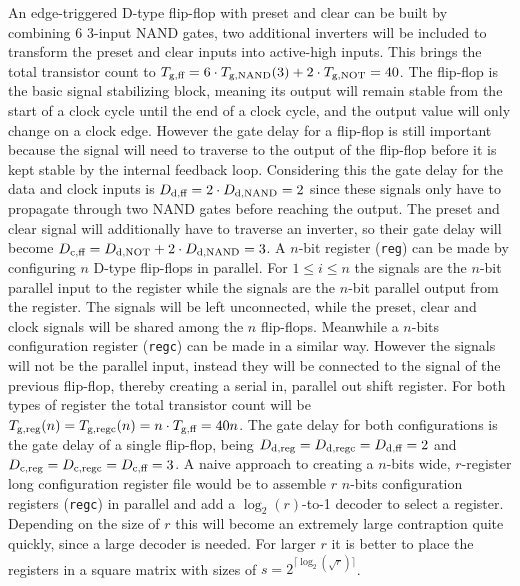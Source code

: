 \begin{itemize}
    An edge-triggered D-type flip-flop with preset and clear can be built by combining $6$ $3$-input NAND gates\cite{74x74}, two additional inverters will be included to transform the preset and clear inputs into active-high inputs. This brings the total transistor count to $\f{T}{g}{ff} = 6 \cdot \f{T}{g}{NAND}(3) + 2 \cdot \f{T}{g}{NOT} = 40$. The flip-flop is the basic signal stabilizing block, meaning its output will remain stable from the start of a clock cycle until the end of a clock cycle, and the output value will only change on a clock edge. However the gate delay for a flip-flop is still important because the signal will need to traverse to the output of the flip-flop before it is kept stable by the internal feedback loop. Considering this the gate delay for the data and clock inputs is $\f{D}{d}{ff} = 2 \cdot \f{D}{d}{NAND} = 2$ since these signals only have to propagate through two NAND gates before reaching the output. The preset and clear signal will additionally have to traverse an inverter, so their gate delay will become $\f{D}{c}{ff} = \f{D}{d}{NOT} + 2 \cdot \f{D}{d}{NAND} = 3$.
    A $n$-bit register (\texttt{reg}) can be made by configuring $n$ D-type flip-flops in parallel. For $1 \leq i \leq n$ the  signals are the $n$-bit parallel input to the register while the  signals are the $n$-bit parallel output from the register. The  signals will be left unconnected, while the preset, clear and clock signals will be shared among the $n$ flip-flops. Meanwhile a $n$-bits configuration register (\texttt{regc}) can be made in a similar way. However the  signals will not be the parallel input, instead they will be connected to the  signal of the previous flip-flop, thereby creating a serial in, parallel out shift register\cite{74x165}. For both types of register the total transistor count will be $\f{T}{g}{reg}(n) = \f{T}{g}{regc}(n) = n \cdot \f{T}{g}{ff} = 40n$. The gate delay for both configurations is the gate delay of a single flip-flop, being $\f{D}{d}{reg} = \f{D}{d}{regc} = \f{D}{d}{ff} = 2$ and $\f{D}{c}{reg} = \f{D}{c}{regc} = \f{D}{c}{ff} = 3$.
    A naive approach to creating a $n$-bits wide, $r$-register long configuration register file would be to assemble $r$ $n$-bits configuration registers (\texttt{regc}) in parallel and add a $\log_{2}(r)$-to-1 decoder to select a register. Depending on the size of $r$ this will become an extremely large contraption quite quickly, since a large decoder is needed. For larger $r$ it is better to place the registers in a square matrix with sizes of $s = 2^{\lceil\log_{2}(\sqrt{r})\rceil}$. 
    

\end{itemize}
